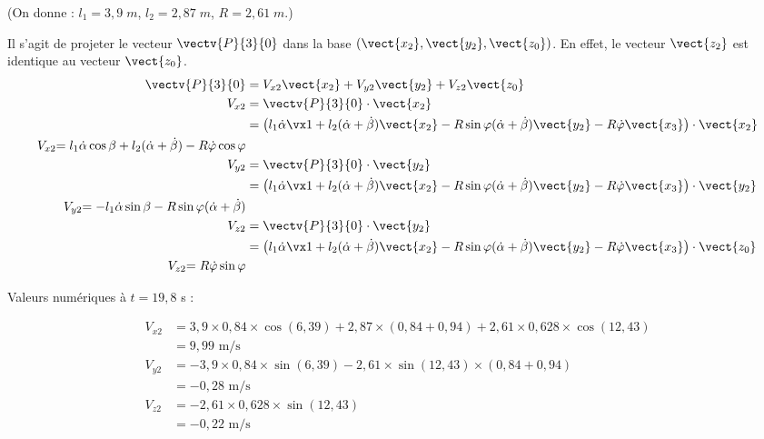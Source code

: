  (On donne : $l_1=3,9\;m$, $l_2=2,87\;m$, $R=2,61\;m$.)
\ifprof
\begin{corrige}

Il s'agit de projeter le vecteur $\vectv{P}{3}{0}$ dans la base $(\vect{x_2}, \vect{y_2} ,\vect{z_0})$. En effet, le vecteur $\vect{z_2}$ est identique au vecteur $\vect{z_0}$.
\begin{align*}
\vectv{P}{3}{0}&=V_{x2}\vect{x_2} +V_{y2}\vect{y_2} + V_{z2}\vect{z_0}\\
V_{x2}&=\vectv{P}{3}{0}\cdot\vect{x_2}\\
	&=\left(l_1\dot\alpha\vx1+l_2(\dot\alpha+\dot\beta)\vect{x_2}-R\sin\varphi(\dot\alpha+\dot\beta)\vect{y_2}-R\dot\varphi\vect{x_3}\right)\cdot\vect{x_2}\\
{V_{x2}}{=l_1 \dot\alpha\cos\beta+l_2 (\dot\alpha+\dot\beta) -R \dot\varphi\cos\varphi}\\
V_{y2}&=\vectv{P}{3}{0}\cdot\vect{y_2}\\
	&=\left(l_1\dot\alpha\vx1+l_2(\dot\alpha+\dot\beta)\vect{x_2}-R\sin\varphi(\dot\alpha+\dot\beta)\vect{y_2}-R\dot\varphi\vect{x_3}\right)\cdot\vect{y_2}\\
{V_{y2}}{=-l_1\dot\alpha\sin\beta-R\sin\varphi(\dot\alpha+\dot\beta)}\\
V_{z2}&=\vectv{P}{3}{0}\cdot\vect{y_2}\\
	&=\left(l_1\dot\alpha\vx1+l_2(\dot\alpha+\dot\beta)\vect{x_2}-R\sin\varphi(\dot\alpha+\dot\beta)\vect{y_2}-R\dot\varphi\vect{x_3}\right)\cdot\vect{z_0}\\
{V_{z2}}{=R\dot\varphi\sin\varphi}
\end{align*}

Valeurs numériques à $t=19,8$ s :

\begin{align*}
V_{x2}&=3,9\times 0,84 \times \cos (6,39) + 2,87  \times (0,84 + 0,94) + 2,61 \times 0,628 \times \cos (12,43) \\
	&=\boxed{9,99\text{ m/s}}\\
V_{y2}&=-3,9 \times 0,84 \times \sin(6,39) - 2,61 \times \sin(12,43) \times (0,84 + 0,94)\\
	&=\boxed{-0,28\text{ m/s}}\\
V_{z2}&=-2,61\times 0,628 \times \sin(12,43) \\
	&=\boxed{-0,22 \text{ m/s}}
\end{align*}

\end{corrige}\else\fi

